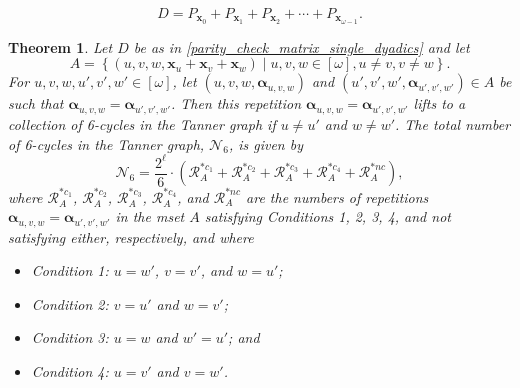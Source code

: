 \documentclass[10pt,a4paper]{amsart}
\newtheorem{theorem}{Theorem}
\newcommand{\balpha}{{\boldsymbol \alpha}}
\newcommand{\bx}{{\mathbf x}}
\begin{document}
\begin{equation}
\label{parity_check_matrix_single_dyadics}
D=P_{\bx_0}+P_{\bx_1}+P_{\bx_2}+\cdots+P_{\bx_{\omega-1}}.
\end{equation}

\begin{theorem}
\label{counting_cycles_thm_6cycles_ncxnv_single_dyadics}
Let $D$ be as in \eqref{parity_check_matrix_single_dyadics} and let
\begin{equation*}
A=\left\{\left(u,v,w,\bx_{u}+\bx_{v}+\bx_{w}\right)\mid u,v,w\in[\omega],u\neq v,v\neq w\right\}.
\end{equation*}
\noindent For $u,v,w,u',v',w'\in[\omega]$, let $(u,v,w,\balpha_{u,v,w})$ and $(u',v',w',\balpha_{u',v',w'}) \in A$ be such that $\balpha_{u,v,w}=\balpha_{u',v',w'}$.  
Then this repetition $\balpha_{u,v,w}=\balpha_{u',v',w'}$ lifts to a collection of 6-cycles in the Tanner graph if $u\neq u'$ and $w\neq w'$. The total number of 6-cycles in the Tanner graph, $\mathcal{N}_6$, is given by
\begin{equation}
\label{counting_cycles_formula_num6cycles_ncxnv_single_dyadics}
\mathcal{N}_6=\frac{2^\ell}{6}\cdot\left(\mathcal{R}_{A}^{*c_1}+\mathcal{R}_{A}^{*c_2}+\mathcal{R}_{A}^{*c_3}+\mathcal{R}_{A}^{*c_4}+\mathcal{R}_{A}^{*nc}\right),
\end{equation}
where $\mathcal{R}_{A}^{*c_1}$, $\mathcal{R}_{A}^{*c_2}$, $\mathcal{R}_{A}^{*c_3}$, $\mathcal{R}_{A}^{*c_4}$, and $\mathcal{R}_{A}^{*nc}$ are the numbers of repetitions $\balpha_{u,v,w}=\balpha_{u',v',w'}$ in the mset $A$ satisfying Conditions 1, 2, 3, 4, and not satisfying either, respectively, and where
\begin{itemize}
\item Condition 1: $u=w'$, $v=v'$, and $w=u'$;
\item Condition 2: $v=u'$ and $w=v'$;
\item Condition 3: $u=w$ and $w'=u'$; and
\item Condition 4: $u=v'$ and $v=w'$.
\end{itemize} 
\end{theorem}
\end{document}
